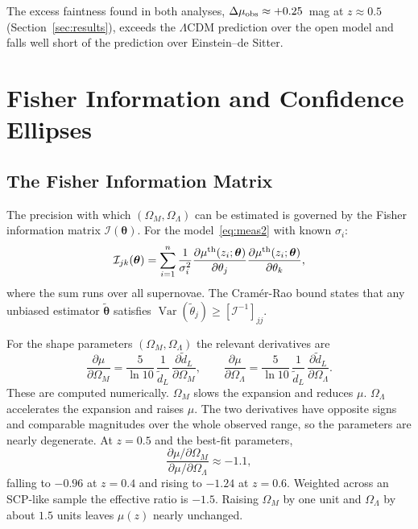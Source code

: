 \documentclass[12pt]{article}
\begin{document}
The excess faintness found in both analyses, $\Delta\mu_{\rm obs} \approx
+0.25$~mag at $z\approx0.5$ (Section~\ref{sec:results}), exceeds the
$\Lambda$CDM prediction over the open model and falls well short of the
prediction over Einstein--de Sitter.

\section{Fisher Information and Confidence Ellipses}
\label{sec:fisher}

\subsection{The Fisher Information Matrix}

The precision with which $(\Omega_M, \Omega_\Lambda)$ can be estimated
is governed by the Fisher information matrix
$\mathcal{I}(\boldsymbol\theta)$.  For the model~\eqref{eq:meas2} with
known $\sigma_i$:
\begin{equation}\label{eq:fisher}
  \mathcal{I}_{jk}(\boldsymbol\theta) =
  \sum_{i=1}^n \frac{1}{\sigma_i^2}
  \frac{\partial\mu^{\rm th}(z_i;\boldsymbol\theta)}{\partial\theta_j}
  \frac{\partial\mu^{\rm th}(z_i;\boldsymbol\theta)}{\partial\theta_k},
\end{equation}
where the sum runs over all supernovae.  The Cram\'er-Rao bound states
that any unbiased estimator $\tilde{\boldsymbol\theta}$ satisfies
$\operatorname{Var}(\tilde\theta_j) \geq [\mathcal{I}^{-1}]_{jj}$.

For the shape parameters $(\Omega_M, \Omega_\Lambda)$ the relevant
derivatives are
\begin{equation}\label{eq:deriv}
  \frac{\partial\mu}{\partial\Omega_M} =
  \frac{5}{\ln 10}\,\frac{1}{\tilde d_L}\,
  \frac{\partial\tilde d_L}{\partial\Omega_M}, \qquad
  \frac{\partial\mu}{\partial\Omega_\Lambda} =
  \frac{5}{\ln 10}\,\frac{1}{\tilde d_L}\,
  \frac{\partial\tilde d_L}{\partial\Omega_\Lambda}.
\end{equation}
These are computed numerically.  $\Omega_M$ slows the expansion and reduces
$\mu$.  $\Omega_\Lambda$ accelerates the expansion and raises $\mu$.  The two
derivatives have opposite signs and comparable magnitudes over the whole
observed range, so the parameters are nearly degenerate.  At $z = 0.5$ and the
best-fit parameters,
\begin{equation}\label{eq:degeneracy}
  \frac{\partial\mu/\partial\Omega_M}{\partial\mu/\partial\Omega_\Lambda}
  \approx -1.1,
\end{equation}
falling to $-0.96$ at $z = 0.4$ and rising to $-1.24$ at $z = 0.6$.  Weighted
across an SCP-like sample the effective ratio is $-1.5$.  Raising $\Omega_M$ by
one unit and $\Omega_\Lambda$ by about $1.5$ units leaves $\mu(z)$ nearly
unchanged.
\end{document}

